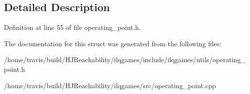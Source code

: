 \subsection{Detailed Description}


Definition at line 55 of file operating\+\_\+point.\+h.



The documentation for this struct was generated from the following files\+:\begin{DoxyCompactItemize}
\item 
/home/travis/build/\+H\+J\+Reachability/ilqgames/include/ilqgames/utils/operating\+\_\+point.\+h\item 
/home/travis/build/\+H\+J\+Reachability/ilqgames/src/operating\+\_\+point.\+cpp\end{DoxyCompactItemize}
